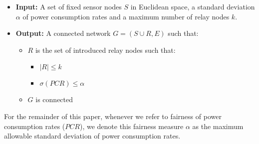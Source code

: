 \begin{itemize}
 \item \textbf{Input:} A set of fixed sensor nodes $S$ in Euclidean space, a standard deviation $\alpha$ of power consumption rates and a maximum number of relay nodes $k$.
\item \textbf{Output:} A connected network $G = (S \cup R, E)$ such that:
	\begin{itemize}
		\item $R$ is the set of introduced relay nodes such that:
		\begin{itemize}
		\item $|R| \leq k$
		\item $\sigma(PCR) \leq \alpha$		
		\end{itemize}
		\item $G$ is connected
	\end{itemize}
\end{itemize}

For the remainder of this paper, whenever we refer to fairness of power consumption rates ($PCR$), we denote this fairness measure $\alpha$ as the maximum allowable standard deviation of power consumption rates.


